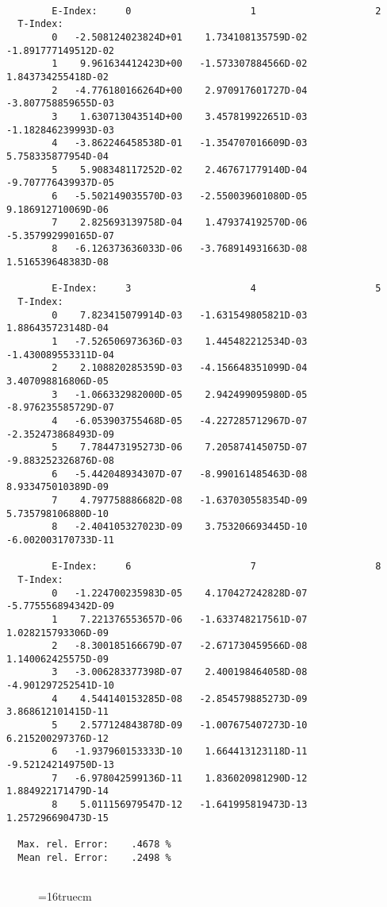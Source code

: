\documentclass[12pt,dvipdfmx]{article}
\begin{document}
\begin{small}\begin{verbatim}

        E-Index:     0                     1                     2
  T-Index:
        0   -2.508124023824D+01    1.734108135759D-02   -1.891777149512D-02
        1    9.961634412423D+00   -1.573307884566D-02    1.843734255418D-02
        2   -4.776180166264D+00    2.970917601727D-04   -3.807758859655D-03
        3    1.630713043514D+00    3.457819922651D-03   -1.182846239993D-03
        4   -3.862246458538D-01   -1.354707016609D-03    5.758335877954D-04
        5    5.908348117252D-02    2.467671779140D-04   -9.707776439937D-05
        6   -5.502149035570D-03   -2.550039601080D-05    9.186912710069D-06
        7    2.825693139758D-04    1.479374192570D-06   -5.357992990165D-07
        8   -6.126373636033D-06   -3.768914931663D-08    1.516539648383D-08

        E-Index:     3                     4                     5
  T-Index:
        0    7.823415079914D-03   -1.631549805821D-03    1.886435723148D-04
        1   -7.526506973636D-03    1.445482212534D-03   -1.430089553311D-04
        2    2.108820285359D-03   -4.156648351099D-04    3.407098816806D-05
        3   -1.066332982000D-05    2.942499095980D-05   -8.976235585729D-07
        4   -6.053903755468D-05   -4.227285712967D-07   -2.352473868493D-09
        5    7.784473195273D-06    7.205874145075D-07   -9.883252326876D-08
        6   -5.442048934307D-07   -8.990161485463D-08    8.933475010389D-09
        7    4.797758886682D-08   -1.637030558354D-09    5.735798106880D-10
        8   -2.404105327023D-09    3.753206693445D-10   -6.002003170733D-11

        E-Index:     6                     7                     8
  T-Index:
        0   -1.224700235983D-05    4.170427242828D-07   -5.775556894342D-09
        1    7.221376553657D-06   -1.633748217561D-07    1.028215793306D-09
        2   -8.300185166679D-07   -2.671730459566D-08    1.140062425575D-09
        3   -3.006283377398D-07    2.400198464058D-08   -4.901297252541D-10
        4    4.544140153285D-08   -2.854579885273D-09    3.868612101415D-11
        5    2.577124843878D-09   -1.007675407273D-10    6.215200297376D-12
        6   -1.937960153333D-10    1.664413123118D-11   -9.521242149750D-13
        7   -6.978042599136D-11    1.836020981290D-12    1.884922171479D-14
        8    5.011156979547D-12   -1.641995819473D-13    1.257296690473D-15

  Max. rel. Error:    .4678 %
  Mean rel. Error:    .2498 %


\end{verbatim}\end{small}
\begin{figure} \label{2.1.5i}
\epsfxsize=16truecm
\end{figure}
\newpage
\end{document}
